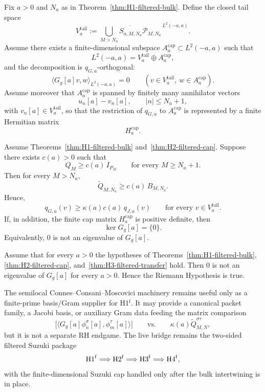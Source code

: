 \begin{theorem}\label{thm:H2-filtered-cap}
Fix $a>0$ and $N_a$ as in Theorem~\ref{thm:H1-filtered-bulk}. Define the closed tail space
\[
  V_a^{\mathrm{tail}}
  :=
  \overline{\bigcup_{M>N_a} S_{a,M,N_a}\mathcal P_{M,N_a}}^{\,L^2(-a,a)}.
\]
Assume there exists a finite-dimensional subspace
$A_a^{\mathrm{cap}}\subset L^2(-a,a)$ such that
\[
  L^2(-a,a)=V_a^{\mathrm{tail}}\oplus A_a^{\mathrm{cap}},
\]
and the decomposition is $q_{G,a}$-orthogonal:
\[
  \langle G_g[a]v,w\rangle_{L^2(-a,a)}=0
  \qquad
  (v\in V_a^{\mathrm{tail}},\ w\in A_a^{\mathrm{cap}}).
\]
Assume moreover that $A_a^{\mathrm{cap}}$ is spanned by finitely many
annihilator vectors
\[
  u_n[a]-v_n[a],
  \qquad |n|\le N_a+1,
\]
with $v_n[a]\in V_a^{\mathrm{tail}}$,
so that the restriction of $q_{G,a}$ to $A_a^{\mathrm{cap}}$
is represented by a finite Hermitian matrix
\[
  H_a^{\mathrm{cap}}.
\]
\end{theorem}

\begin{theorem}\label{thm:H3-filtered-transfer}
Assume Theorems~\ref{thm:H1-filtered-bulk}
and~\ref{thm:H2-filtered-cap}.
Suppose there exists $c(a)>0$ such that
\[
  Q_M\ge c(a)\,I_{P_M}
  \qquad\text{for every }M\ge N_a+1.
\]
Then for every $M>N_a$,
\[
  \widetilde Q_{M,N_a}\ge c(a)\,B_{M,N_a}.
\]
Hence,
\[
  q_{G,a}(v)\ge \kappa(a)c(a)\,q_{J,a}(v)
  \qquad\text{for every }v\in V_a^{\mathrm{tail}}.
\]
If, in addition, the finite cap matrix $H_a^{\mathrm{cap}}$ is positive definite,
then
\[
  \ker G_g[a]=\{0\}.
\]
Equivalently, $0$ is not an eigenvalue of $G_g[a]$.
\end{theorem}

\begin{corollary}\label{cor:H4-filtered-RH}
Assume that for every $a>0$ the hypotheses of
Theorems~\ref{thm:H1-filtered-bulk},
\ref{thm:H2-filtered-cap},
and~\ref{thm:H3-filtered-transfer}
hold.
Then $0$ is not an eigenvalue of $G_g[a]$ for every $a>0$.
Hence the Riemann Hypothesis is true.
\end{corollary}

\begin{remark}\label{rem:h1-semilocal-engine}
The semilocal Connes--Consani--Moscovici machinery remains useful only as a
finite-prime basis/Gram supplier for \textup{H1}$^{\mathrm f}$. It may provide a
canonical packet family, a Jacobi basis, or auxiliary Gram data feeding the
matrix comparison
\[
  \bigl[\langle G_g[a]\phi_n^\sigma[a],\phi_m^\tau[a]\rangle\bigr]
  \qquad\text{vs.}\qquad
  \kappa(a)\widetilde Q_{M,N}^{\sigma\tau},
\]
but it is not a separate RH endgame. The live bridge remains the two-sided
filtered Suzuki package
\[
  \textup{H1}^{\mathrm f}\Longrightarrow \textup{H2}^{\mathrm f}
  \Longrightarrow \textup{H3}^{\mathrm f}\Longrightarrow \textup{H4}^{\mathrm f},
\]
with the finite-dimensional Suzuki cap handled only after the bulk
intertwining is in place.
\end{remark}

